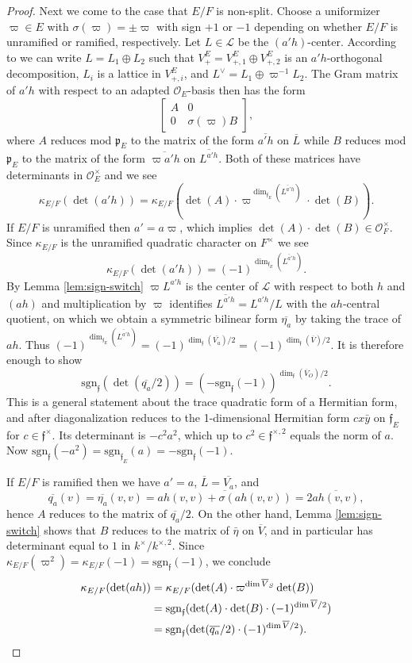 \documentclass{article}
\def\mf#1{\mathfrak{#1}}
\def\mc#1{\mathcal{#1}}
\def\tx#1{\textrm{#1}}
\def\ol#1{\overline{#1}}
\def\cO{\mathcal{O}}
\theoremstyle{definition}
\numberwithin{equation}{subsection}
\renewcommand{\-}{\hyp{}}
\newcommand{\rf}{\mathfrak{f}}
\newcommand{\oV}{\ol{V}}
\newcommand{\oVS}{\overline{V}}
\newcommand{\oVO}{\overline{V_a}}
\begin{document}
\begin{proof}
	Next we come to the case that $E/F$ is non-split. Choose a uniformizer $\varpi \in E$ with $\sigma(\varpi) = \pm \varpi$ with sign $+1$ or $-1$ depending on whether $E/F$ is unramified or ramified, respectively. Let $L \in \mc{L}$ be the $(a'h)$-center. According to \cite[Proposition 4.3]{Jacobowitz1962} we can write $L = L_1 \oplus L_2$ such that $V_+^E=V_{+,1}^E \oplus V_{+,2}^E$ is an $a'h$-orthogonal decomposition, $L_i$ is a lattice in $V_{+,i}^E$, and $L^\vee=L_1 \oplus \varpi^{-1}L_2$. The Gram matrix of $a'h$ with respect to an adapted $\cO_E$-basis then has the form 
	\[ \begin{bmatrix}
		A&0\\ 0&\sigma(\varpi) B
	\end{bmatrix}, \]
	where $A$ reduces mod $\mf{p}_E$ to the matrix of the form $\ol{a'h}$ on $\ol{L}$ while $B$ reduces mod $\mf{p}_E$ to the matrix of the form $\ol{\varpi a'h}$ on $\ol{L^{a'h}}$. Both of these matrices have determinants in $\cO_E^\times$ and we see
	\[ 	\kappa_{E/F}(\det(a'h))=\kappa_{E/F}(\det(A) \cdot \varpi^{\dim_{\rf_E}(\ol{L^{a'h}})}\cdot\det(B)). \]
	If $E/F$ is unramified then $a'=a\varpi$, which implies $\det(A)\cdot\det(B) \in \cO_F^\times$. Since $\kappa_{E/F}$ is the unramified quadratic character on $F^\times$ we see
	\[ \kappa_{E/F}(\det(a'h)) = (-1)^{\dim_{\rf_E}(\ol{L^{a'h}})}. \]
	By Lemma \ref{lem:sign-switch} $\varpi L^{a'h}$ is the center of $\mc{L}$ with respect to both $h$ and $(ah)$ and multiplication by $\varpi$ identifies $\ol{L^{a'h}}=L^{a'h}/L$ with the $ah$-central quotient, on which we obtain a symmetric bilinear form $\ol{\eta_a}$ by taking the trace of $ah$. Thus $(-1)^{\dim_{\rf_E}(\ol{L^{a'h}})}=(-1)^{\dim_{\rf}(\oVO)/2}=(-1)^{\dim_{\rf}(\oVS)/2}$. It is therefore enough to show 
	\[ \tx{sgn}_\rf(\det(\ol{q_a}/2)) = (-\tx{sgn}_\rf(-1))^{\dim_{\rf}(\oV_O)/2}. \] 
	This is a general statement about the trace quadratic form of a Hermitian form, and after diagonalization reduces to the 1-dimensional Hermitian form $cx\bar y$ on $\rf_E$ for $c \in \rf^\times$. Its determinant is $-c^2a^2$, which up to $c^2 \in \rf^{\times,2}$ equals the norm of $a$. Now $\tx{sgn}_{\rf}(-a^2)=\tx{sgn}_{\rf_E}(a)=-\tx{sgn}_\rf(-1)$.

	If $E/F$ is ramified then we have $a'=a$, $\ol{L}=\oVO$, and 
	\[ \ol{q_a}(v)=\ol{\eta_a}(v,v)=\overline{ah(v,v)+\sigma(ah(v,v))} = 2\overline{ah(v,v)}, \]
	hence $A$ reduces to the matrix of $\ol{q_a}/2$. On the other hand, Lemma \ref{lem:sign-switch} shows that $B$ reduces to the matrix of $\bar\eta$ on $\oVS$, and in particular has determinant equal to $1$ in $k^\times/k^{\times,2}$. Since $\kappa_{E/F}(\varpi^2)=\kappa_{E/F}(-1)=\tx{sgn}_\rf(-1)$, we conclude
	\begin{align*}
	\kappa_{E/F}(\det(ah))&=\kappa_{E/F}(\det(A) \cdot \varpi^{\dim\ol{V}_S}\det(B)) \\
	&=\tx{sgn}_\rf(\det(A) \cdot \det(B) \cdot (-1)^{\dim\oVS/2})\\
	&=\tx{sgn}_\rf(\det(\ol{q_a}/2) \cdot (-1)^{\dim\oVS/2}).\hfill\qedhere
	\end{align*}
\end{proof}
\end{document}
